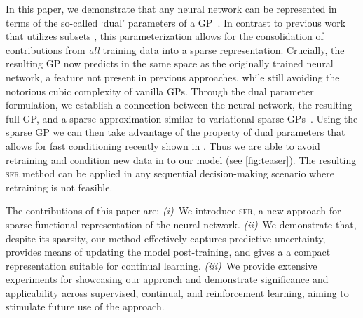 \documentclass{article}
\newcommand{\our}{\textsc{sfr}\xspace}
\begin{document}
In this paper, we demonstrate that any neural network can be represented in terms of the so-called `dual' parameters of a GP~\cite{csato2002sparse, adam2021dual, chang2020fast}. In contrast to previous work that utilizes subsets \cite{immer2021scalable}, this parameterization allows for the consolidation of contributions from {\em all} training data into a sparse representation. Crucially, the resulting GP now predicts in the same space as the originally trained neural network, a feature not present in previous approaches, while still avoiding the notorious cubic complexity of vanilla GPs. Through the dual parameter formulation, we establish a connection between the neural network, the resulting full GP, and a sparse approximation similar to variational sparse GPs~\cite{titsias2009variational}. Using the sparse GP we can then take advantage of the property of dual parameters that allows for fast conditioning recently shown in \cite{chang2022fantasizing}. Thus we are able to avoid retraining and condition new data in to our model (see \cref{fig:teaser}). The resulting \our method can be applied in any sequential decision-making scenario where retraining is not feasible.



The contributions of this paper are:
%
{\em (i)}~We introduce \our, a new approach for sparse functional representation of the neural network.
{\em (ii)}~We demonstrate that, despite its sparsity, our method effectively captures predictive uncertainty, provides means of updating the model post-training, and gives a a compact representation suitable for continual learning.
{\em (iii)}~We provide extensive experiments for showcasing our approach and demonstrate significance and applicability across supervised, continual, and reinforcement learning, aiming to stimulate future use of the approach.

\end{document}
